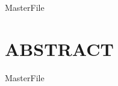 \expandafter\ifx\csname MasterFile\endcsname\relax
\def\SubFile{hoge}


\fi
\cleardoublepage
\chapter*{ABSTRACT}

\expandafter\ifx\csname MasterFile\endcsname\relax

\fi
